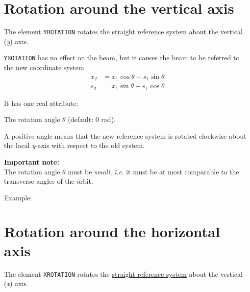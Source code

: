 \section{Rotation around the vertical axis}
\label{sec:yrotation}

The element \texttt{YROTATION} rotates the
\hyperref[subsec:local-straight]{straight reference system} about the
vertical (\textit{y}) axis.


\texttt{YROTATION} has no effect on the beam, but it
causes the beam to be referred to the new coordinate system  \\
\begin{equation}\begin{split}
x_2 &= x_1 \cos\theta - s_1 \sin\theta \\
s_2 &= x_1 \sin\theta + s_1 \cos\theta
\end{split}\end{equation}

It has one real attribute:
\begin{madlist}
    The rotation angle $\theta$ (default: 0 rad).
\end{madlist}

A positive angle means that the new reference system is rotated
clockwise about the local \textit{y}-axis with respect to the old system.

\textbf{Important note:} \\
The rotation angle $\theta$ must be \emph{small}, \textsl{i.e.} it must be at
most comparable to the transverse angles of the orbit.

Example:

\section{Rotation around the horizontal axis}
\label{sec:xrotation}

The element \texttt{XROTATION} rotates the
\hyperref[subsec:local-straight]{straight reference system} about the
vertical (\textit{x}) axis.

